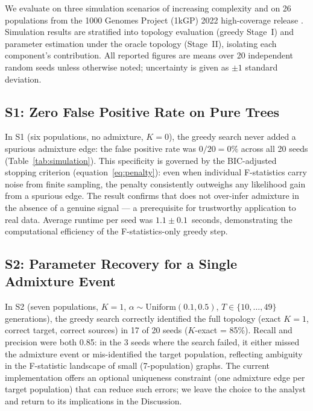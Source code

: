 \label{sec:results}

We evaluate \hapgraph{} on three simulation scenarios of increasing complexity
and on 26 populations from the 1000 Genomes Project (1kGP) 2022 high-coverage
release \citep{ByrskaBishop2022}.
Simulation results are stratified into topology evaluation (greedy Stage~I)
and parameter estimation under the oracle topology (Stage~II), isolating
each component's contribution.
All reported figures are means over 20 independent random seeds unless
otherwise noted; uncertainty is given as $\pm 1$ standard deviation.

\subsection*{S1: Zero False Positive Rate on Pure Trees}

In S1 (six populations, no admixture, $K=0$), the greedy search never added
a spurious admixture edge: the false positive rate was $0/20 = 0\%$ across
all 20 seeds (Table~\ref{tab:simulation}).
This specificity is governed by the BIC-adjusted stopping criterion
(equation~\ref{eq:penalty}): even when individual F-statistics carry noise from
finite sampling, the penalty consistently outweighs any likelihood gain from
a spurious edge.
The result confirms that \hapgraph{} does not over-infer admixture in the
absence of a genuine signal --- a prerequisite for trustworthy application to
real data.
Average runtime per seed was $1.1 \pm 0.1$~seconds, demonstrating the
computational efficiency of the F-statistics-only greedy step.

\subsection*{S2: Parameter Recovery for a Single Admixture Event}

In S2 (seven populations, $K=1$, $\alpha \sim \mathrm{Uniform}(0.1, 0.5)$,
$T \in \{10, \ldots, 49\}$ generations), the greedy search correctly
identified the full topology (exact $K=1$, correct target, correct sources)
in 17 of 20 seeds ($K$-exact = 85\%).
Recall and precision were both 0.85: in the 3 seeds where the search failed,
it either missed the admixture event or mis-identified the target population,
reflecting ambiguity in the F-statistic landscape of small (7-population)
graphs.
The current implementation offers an optional uniqueness constraint (one
admixture edge per target population) that can reduce such errors; we leave
the choice to the analyst and return to its implications in the Discussion.


